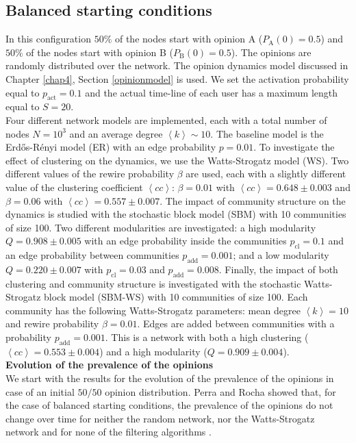 \documentclass[11 pt , letterpaper , twoside , openright]{book}
\begin{document}
\subsection{Balanced starting conditions}
\label{50-50}
In this configuration $50 \%$ of the nodes start with opinion A ($P_{\text{A}}(0) = 0.5$) and $50 \%$ of the nodes start with opinion B ($P_{\text{B}}(0) = 0.5$). The opinions are randomly distributed over the network. The opinion dynamics model discussed in Chapter \ref{chap4}, Section \ref{opinionmodel} is used. We set the activation probability equal to $p_{\text{act}} = 0.1$ and the actual time-line of each user has a maximum length equal to $S=20$.\\
\newline
Four different network models are implemented, each with a total number of nodes $N = 10^3$ and an average degree $\left<k\right> \sim 10$. The baseline model is the Erd\H{o}s-R\'{e}nyi model (ER) with an edge probability $p = 0.01$. To investigate the effect of clustering on the dynamics, we use the Watts-Strogatz model (WS). Two different values of the rewire probability $\beta$ are used, each with a slightly different value of the clustering coefficient $\left<cc\right>$: $\beta = 0.01$ with $\left<cc\right> = 0.648 \pm 0.003$ and $\beta = 0.06$ with $\left<cc\right> = 0.557 \pm 0.007$. The impact of community structure on the dynamics is studied with the stochastic block model (SBM) with 10 communities of size 100. Two different modularities are investigated: a high modularity $Q = 0.908 \pm 0.005$ with an edge probability inside the communities $p_{\text{cl}} = 0.1$ and an edge probability between communities $p_{\text{add}} = 0.001$; and a low modularity $Q = 0.220 \pm 0.007$ with $p_{\text{cl}} = 0.03$ and $p_{\text{add}} = 0.008$. Finally, the impact of both clustering and community structure is investigated with the stochastic Watts-Strogatz block model (SBM-WS) with 10 communities of size 100. Each community has the following Watts-Strogatz parameters: mean degree $\left<k\right> =10$ and rewire probability $\beta = 0.01$. Edges are added between communities with a probability $p_{\text{add}} = 0.001$. This is a network with both a high clustering ($\left<cc\right> = 0.553 \pm 0.004$) and a high modularity ($Q = 0.909 \pm 0.004$).  \\
\newline
\textbf{Evolution of the prevalence of the opinions}\\
\newline
We start with the results for the evolution of the prevalence of the opinions in case of an initial $50/50$ opinion distribution. Perra and Rocha showed that, for the case of balanced starting conditions, the prevalence of the opinions do not change over time for neither the random network, nor the Watts-Strogatz network and for none of the filtering algorithms \cite{Perra2019}. 
\end{document}
